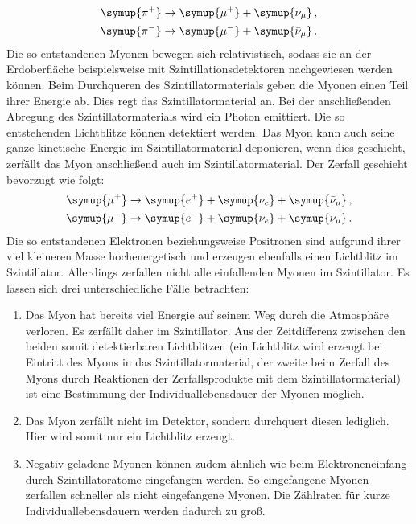 \begin{align}
  \symup{\pi^+}\to\symup{\mu^+}+\symup{\nu_\mu}\text{\,,}\\
  \symup{\pi^-}\to\symup{\mu^-}+\symup{\bar{\nu}_\mu}\text{\,.}
\end{align}
Die so entstandenen Myonen bewegen sich relativistisch, sodass sie an der Erdoberfläche beispielsweise mit Szintillationsdetektoren nachgewiesen werden können.
Beim Durchqueren des Szintillatormaterials geben die Myonen einen Teil ihrer Energie ab. Dies regt das Szintillatormaterial an. Bei der anschließenden Abregung des Szintillatormaterials wird ein Photon emittiert.
Die so entstehenden Lichtblitze können detektiert werden.
Das Myon kann auch seine ganze kinetische Energie im Szintillatormaterial deponieren, wenn dies geschieht, zerfällt das Myon anschließend auch im Szintillatormaterial.
Der Zerfall geschieht bevorzugt wie folgt:
\begin{align}
  \symup{\mu^+}\to\symup{e^+}+\symup{\nu_e}+\symup{\bar{\nu}_\mu} \text{\,,}\\
  \symup{\mu^-}\to\symup{e^-}+\symup{\bar{\nu}_e}+\symup{\nu_\mu}\text{\,.}
\end{align}
Die so entstandenen Elektronen beziehungsweise Positronen sind aufgrund ihrer viel kleineren Masse hochenergetisch und erzeugen ebenfalls einen Lichtblitz im Szintillator.
Allerdings zerfallen nicht alle einfallenden Myonen im Szintillator.
Es lassen sich drei unterschiedliche Fälle betrachten:
\begin{enumerate}
  \item Das Myon hat bereits viel Energie auf seinem Weg durch die Atmosphäre verloren. Es zerfällt daher im Szintillator. Aus der Zeitdifferenz zwischen den beiden somit detektierbaren Lichtblitzen (ein Lichtblitz wird erzeugt bei Eintritt des Myons in das Szintillatormaterial, der zweite beim Zerfall des Myons durch Reaktionen der Zerfallsprodukte mit dem Szintillatormaterial) ist eine Bestimmung der Individuallebensdauer der Myonen möglich.
  \item Das Myon zerfällt nicht im Detektor, sondern durchquert diesen lediglich. Hier wird somit nur ein Lichtblitz erzeugt.
  \item Negativ geladene Myonen können zudem ähnlich wie beim Elektroneneinfang durch Szintillatoratome eingefangen werden.
  So eingefangene Myonen zerfallen schneller als nicht eingefangene Myonen. Die Zählraten für kurze Individuallebensdauern werden dadurch zu groß.
\end{enumerate}

